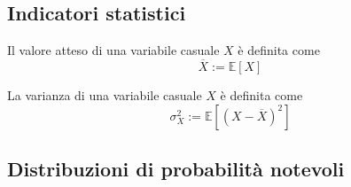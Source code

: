 \subsection{Indicatori statistici}
\begin{definition}
    Il valore atteso di una variabile casuale $X$ è definita come
    \begin{equation}
        \overline{X} := \mathbb{E}[X]
    \end{equation}
\end{definition}
\begin{definition}[Varianza]
    La varianza di una variabile casuale $X$ è definita come
    \begin{equation}
        \sigma_{X}^2 := \mathbb{E}\left[(X-\overline{X})^2\right]
    \end{equation}
\end{definition}
\subsection{Distribuzioni di probabilità notevoli}
